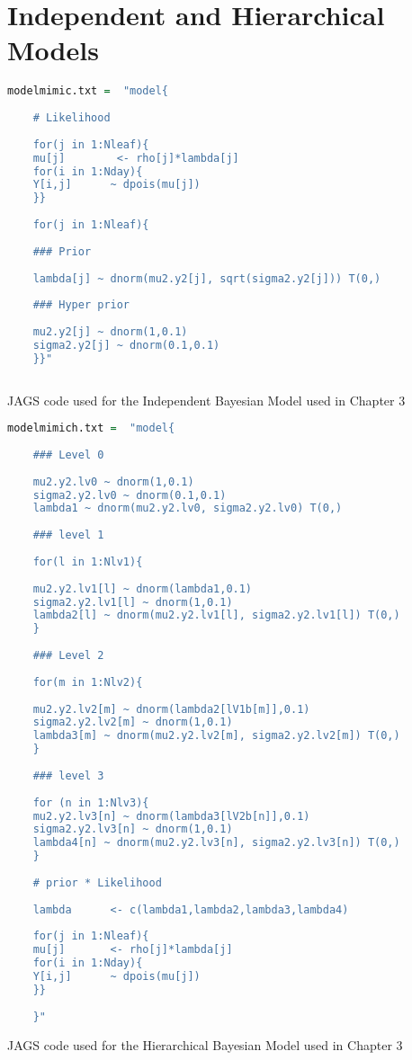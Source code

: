 \section{Independent and Hierarchical Models}

\begin{table}[!h]
	\begin{lstlisting}[language=R, showstringspaces=false]
	modelmimic.txt =  "model{
	
	# Likelihood
	
	for(j in 1:Nleaf){
	mu[j]        <- rho[j]*lambda[j]
	for(i in 1:Nday){
	Y[i,j]      ~ dpois(mu[j])
	}}
	
	for(j in 1:Nleaf){
	
	### Prior
	
	lambda[j] ~ dnorm(mu2.y2[j], sqrt(sigma2.y2[j])) T(0,) 
	
	### Hyper prior
	
	mu2.y2[j] ~ dnorm(1,0.1)   
	sigma2.y2[j] ~ dnorm(0.1,0.1)
	}}"
	
	\end{lstlisting}
	\caption{JAGS code used for the Independent Bayesian Model used in Chapter 3}
	\label{ibmhbm}
\end{table}


\newpage %

\begin{table}[!h]
	\begin{lstlisting}[language=R, showstringspaces=false]
	modelmimich.txt =  "model{
	
	### Level 0
	
	mu2.y2.lv0 ~ dnorm(1,0.1) 
	sigma2.y2.lv0 ~ dnorm(0.1,0.1) 
	lambda1 ~ dnorm(mu2.y2.lv0, sigma2.y2.lv0) T(0,)
	
	### level 1
	
	for(l in 1:Nlv1){
	
	mu2.y2.lv1[l] ~ dnorm(lambda1,0.1) 
	sigma2.y2.lv1[l] ~ dnorm(1,0.1) 
	lambda2[l] ~ dnorm(mu2.y2.lv1[l], sigma2.y2.lv1[l]) T(0,) 
	}
	
	### Level 2
	
	for(m in 1:Nlv2){
	
	mu2.y2.lv2[m] ~ dnorm(lambda2[lV1b[m]],0.1) 
	sigma2.y2.lv2[m] ~ dnorm(1,0.1) 
	lambda3[m] ~ dnorm(mu2.y2.lv2[m], sigma2.y2.lv2[m]) T(0,) 
	}
	
	### level 3
	
	for (n in 1:Nlv3){
	mu2.y2.lv3[n] ~ dnorm(lambda3[lV2b[n]],0.1) 
	sigma2.y2.lv3[n] ~ dnorm(1,0.1) 
	lambda4[n] ~ dnorm(mu2.y2.lv3[n], sigma2.y2.lv3[n]) T(0,) 
	}
	
	# prior * Likelihood
	
	lambda      <- c(lambda1,lambda2,lambda3,lambda4)
	
	for(j in 1:Nleaf){
	mu[j]       <- rho[j]*lambda[j]
	for(i in 1:Nday){
	Y[i,j]      ~ dpois(mu[j])
	}}
	
	}"
	\end{lstlisting}
	\caption{JAGS code used for the Hierarchical Bayesian Model used in Chapter 3}
	\label{ibmhbm2}
\end{table}

\newpage %